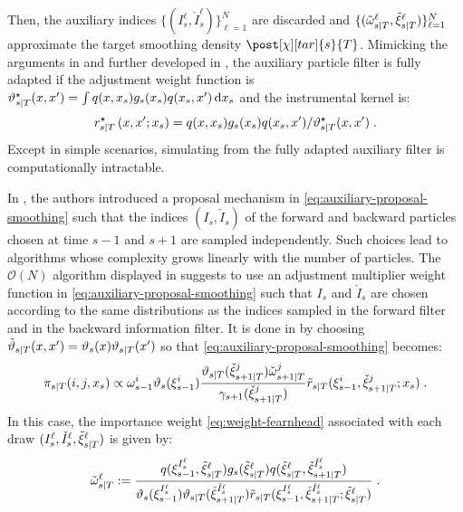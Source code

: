 Then, the auxiliary indices $\{(I_{s}^\ell,\check{I}_{s}^\ell)\}_{\ell=1}^N$ are discarded and $\{ (\tilde{\omega}_{s|T}^{\ell},\tilde{\xi}_{s|T}^{\ell}) \}_{\ell=1}^N$ approximate the target smoothing density $\post[\Xinit][tar]{s}{T}$. Mimicking the arguments in \cite{huerzeler:kunsch:1998} and further developed in \cite{kuensch:2005}, the auxiliary particle filter is fully adapted if the adjustment weight function is $\adjfunc[fully]{s}{T}{x,x'} = \int q(x,x_s) g_s(x_s) q(x_s,x') \, \rmd x_s$ and the instrumental kernel is:
\[
\kiss[fully]{s}{T}\left(x,x'; x_s\right) = q(x,x_s) g_s(x_s) q(x_s,x')/\adjfunc[fully]{s}{T}{x,x'}\eqsp.
\]
 Except in simple scenarios, simulating from the fully adapted auxiliary filter is computationally intractable.

In \cite{fearnhead:wyncoll:tawn:2010}, the authors introduced a proposal mechanism in \eqref{eq:auxiliary-proposal-smoothing} such that the indices $(I_{s},\check{I}_{s})$ of the forward and backward particles chosen at time $s-1$ and $s+1$ are sampled independently.  Such choices lead to algorithms whose complexity grows linearly with the number of particles. The $\mathcal{O}(N)$ algorithm displayed in  \cite{fearnhead:wyncoll:tawn:2010} suggests to use an adjustment multiplier weight function in \eqref{eq:auxiliary-proposal-smoothing} such that $I_{s}$ and $\check{I}_{s}$ are chosen according to the same distributions as the indices sampled in the forward filter and in the backward information filter. It is done in \cite{fearnhead:wyncoll:tawn:2010} by choosing $\adjfunc[smooth]{s}{T}{x,x'} = \adjfuncforward{s}(x)\adjfunc{s}{T}{x'}$ so that \eqref{eq:auxiliary-proposal-smoothing} becomes:
\begin{equation}
\label{eq:inst-fearnhead:linear}
\instrpostaux{s}{T}(i,j,x_s) \propto  \ewght{s-1}{i}\adjfuncforward{s}(\epart{s-1}{i}) \frac{\adjfunc{s}{T}{\ebackpart{s+1}{T}{j}} \ebackwght{s+1}{T}{j}}{\gamma_{s+1}(\ebackpart{s+1}{T}{j})} \kiss[smooth]{s}{T}(\epart{s-1}{i},\ebackpart{s+1}{T}{j}; x_s)\eqsp.
\end{equation}
In this case, the importance weight \eqref{eq:weight-fearnhead} associated with each draw $(I_{s}^\ell,\check{I}_{s}^\ell, \tilde{\xi}_{s|T}^{\ell})$ is given by:
\begin{equation}
\label{eq:weight-fearnhead:linear}
\smwght{s}{T}{\ell} \eqdef \frac{q(\epart{s-1}{I_{s}^\ell},\smpart{s}{T}{\ell}) g_s(\smpart{s}{T}{\ell}) q(\smpart{s}{T}{\ell},\ebackpart{s+1}{T}{\check{I}_{s}^\ell})}{\adjfuncforward{s}(\epart{s-1}{I_{s}^\ell})\adjfunc{s}{T}{\ebackpart{s+1}{T}{\check{I}_{s}^\ell}}
\kiss[smooth]{s}{T}(\epart{s-1}{I_{s}^\ell},\ebackpart{s+1}{T}{\check{I}_{s}^\ell}; \smpart{s}{T}{\ell}) } \eqsp.
\end{equation}
